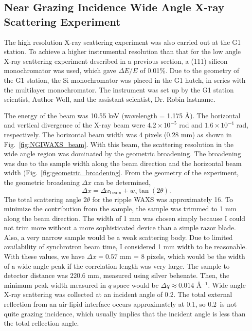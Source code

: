 \subsection{Near Grazing Incidence Wide Angle X-ray Scattering Experiment}
The high resolution X-ray scattering experiment was also carried out at 
the G1 station. To achieve a higher instrumental resolution than that for 
the low angle X-ray scattering experiment described in a previous section, 
a (111) silicon monochromator was used, which gave $\Delta E/E$ of 0.01\%.
Due to the geometry of the G1 station, the Si monochromator was placed in
the G1 hutch, in series with the multilayer monochromator. 
The instrument was set up by the G1
station scientist, Author Woll, and the assistant scientist, Dr. Robin lastname.

The energy of the beam was 10.55 keV (wavelength = 1.175 \AA).
The horizontal and vertical divergence of the X-ray beam were
$4.2 \times 10^{-5}$ rad and $1.6 \times 10^{-4}$ rad, respectively. 
The horizontal beam width was 4 pixels (0.28 mm) as shown in
Fig.~\ref{fig:NGIWAXS_beam}.
With this beam, the scattering resolution in the wide angle region 
was dominated by the geometric broadening. The broadening was due to the
sample width along the beam direction and the horizontal beam width 
(Fig.~\ref{fig:geometric_broadening}. From the geometry of the experiment, 
the geometric broadening $\Delta x$ can be determined,
\[
\Delta x = \Delta x_\textrm{beam} + w_\textrm{s}\tan(2\theta).
\] 
The total scattering angle $2\theta$ for the ripple WAXS was approximately 
16\textdegree. 
To minimize the contribution from the sample, the sample was trimmed to 1 mm
along the beam direction. 
The width of 1 mm was chosen simply because I could not trim more
without a more sophisticated device than a simple razor blade. Also, a very
narrow sample would be a weak scattering body. Due to limited availability
of synchrotron beam time, I considered 1 mm width to be reasonable.
With these values, we have $\Delta x = 0.57$ mm = 8 pixels, which would be the 
width of a wide angle peak if the correlation length was very large.
The sample to detector distance was 220.6 mm, measured using silver behenate.
Then, the minimum peak width measured in $q$-space would be
$\Delta q \approx 0.014$ \AA$^{-1}$.
Wide angle X-ray scattering was collected at an incident angle of 0.2\textdegree. 
The total external reflection from an air-lipid interface occurs approximately 
at 0.1\textdegree, so 0.2\textdegree\ is not quite grazing incidence, which
usually implies that the incident angle is less than the total reflection angle.

